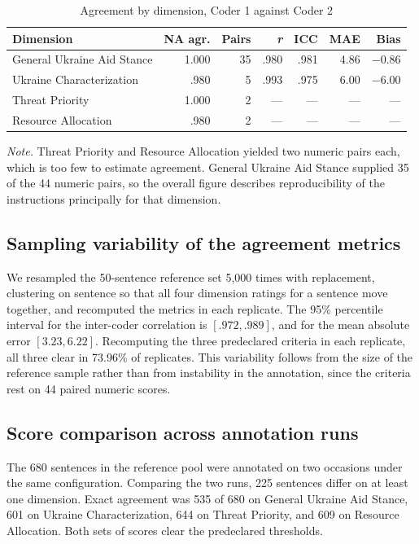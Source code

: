 \begin{table}[htbp]
\centering\small
\caption{Agreement by dimension, Coder 1 against Coder 2}
\begin{tabular}{@{}p{}rrrrrr@{}}
\toprule
\textbf{Dimension} & \textbf{NA agr.} & \textbf{Pairs} & \textbf{\textit{r}} & \textbf{ICC} & \textbf{MAE} & \textbf{Bias} \\
\midrule
General Ukraine Aid Stance & 1.000 & 35 & .980 & .981 & 4.86 & $-$0.86 \\
Ukraine Characterization & .980 & 5 & .993 & .975 & 6.00 & $-$6.00 \\
Threat Priority & 1.000 & 2 & --- & --- & --- & --- \\
Resource Allocation & .980 & 2 & --- & --- & --- & --- \\
\bottomrule
\end{tabular}
\begin{minipage}{\textwidth}\footnotesize \textit{Note.} Threat Priority and Resource Allocation yielded two numeric pairs each, which is too few to estimate agreement. General Ukraine Aid Stance supplied 35 of the 44 numeric pairs, so the overall figure describes reproducibility of the instructions principally for that dimension.\end{minipage}
\end{table}

\subsection*{Sampling variability of the agreement metrics}

We resampled the 50-sentence reference set 5,000 times with replacement, clustering on sentence so that all four dimension ratings for a sentence move together, and recomputed the metrics in each replicate. The 95\% percentile interval for the inter-coder correlation is $[.972, .989]$, and for the mean absolute error $[3.23, 6.22]$. Recomputing the three predeclared criteria in each replicate, all three clear in 73.96\% of replicates. This variability follows from the size of the reference sample rather than from instability in the annotation, since the criteria rest on 44 paired numeric scores.

\subsection*{Score comparison across annotation runs}

The 680 sentences in the reference pool were annotated on two occasions under the same configuration. Comparing the two runs, 225 sentences differ on at least one dimension. Exact agreement was 535 of 680 on General Ukraine Aid Stance, 601 on Ukraine Characterization, 644 on Threat Priority, and 609 on Resource Allocation. Both sets of scores clear the predeclared thresholds.

